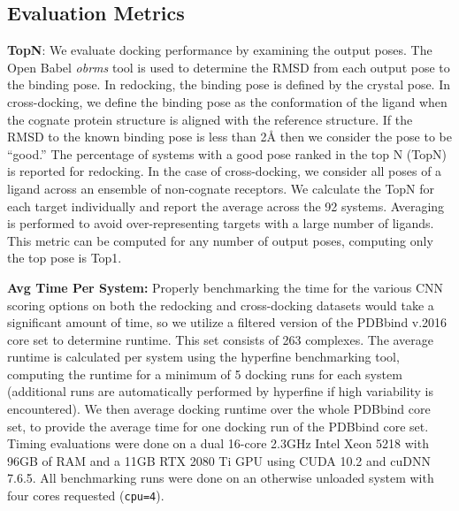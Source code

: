 \documentclass[linenumbers,doublespacing]{bmcart}
\begin{document}
\subsection{Evaluation Metrics}

\textbf{TopN}: We evaluate docking performance by examining the output poses. The Open Babel \textit{obrms} tool\cite{babelopen,o2011open} is used to determine the RMSD from each output pose to the binding pose. In redocking, the binding pose is defined by the crystal pose. In cross-docking, we define the binding pose as the conformation of the ligand when the cognate protein structure is aligned with the reference structure. If the RMSD to the known binding pose is less than 2{\AA} then we consider the pose to be ``good.'' The percentage of systems with a good pose ranked in the top N (TopN)  is reported for redocking. In the case of cross-docking, we consider all poses of a ligand across an ensemble of non-cognate receptors.  We calculate the TopN for each target individually and report the average across the 92 systems. Averaging is performed to avoid over-representing targets with a large number of ligands. This metric can be computed for any number of output poses, computing only the top pose is Top1.

\textbf{Avg Time Per System:}
Properly benchmarking the time for the various CNN scoring options on both the redocking and cross-docking datasets would take a significant amount of time, so we utilize a filtered version of the PDBbind v.2016\cite{su2018comparative} core set to determine runtime. This set consists of 263 complexes. The average runtime is calculated per system using the hyperfine benchmarking tool\cite{hyperfine}, computing the runtime for a minimum of 5 docking runs for each system (additional runs are automatically performed by hyperfine if high variability is encountered). We then average docking runtime over the whole PDBbind core set, to provide the average time for one docking run of the PDBbind core set. Timing evaluations were done on a dual 16-core 2.3GHz Intel Xeon 5218 with 96GB of RAM and a 11GB RTX 2080 Ti GPU using CUDA 10.2 and cuDNN 7.6.5. All benchmarking runs were done on an otherwise unloaded system with four cores requested (\texttt{cpu=4}).
\end{document}
